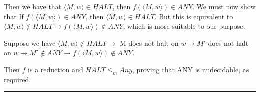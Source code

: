 \documentclass[twoside]{article}
\newenvironment{proof}{{\bf Proof:}}{\hfill\rule{2mm}{2mm}}
\begin{document}
\begin{proof}
 Then we have that  $\langle M, w \rangle \in HALT$, then $f(\langle M, w \rangle) \in ANY$.\newline
 We must now show that If $f(\langle M, w \rangle) \in ANY$, then  $\langle M, w \rangle \in HALT$. But this is equivalent to $\langle M, w \rangle \notin HALT \rightarrow f(\langle M, w \rangle) \notin ANY$, which is more suitable to our purpose.\newline
 
Suppose we have $\langle M, w \rangle \notin HALT \rightarrow $ M does not halt on $w \rightarrow M'$ does not halt on $w \rightarrow M' \notin ANY \rightarrow  f(\langle M, w \rangle) \notin ANY$.\newline

Then $f$ is a reduction and $HALT \leq_m Any$, proving that ANY is undecidable, as required.
\end{proof}



\end{document}
